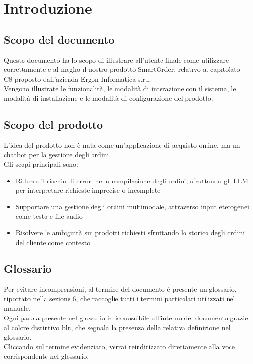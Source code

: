 \section{Introduzione}
\subsection{Scopo del documento}
Questo documento ha lo scopo di illustrare all'utente finale come utilizzare correttamente e al meglio il nostro prodotto SmartOrder, relativo al capitolato C8 proposto dall'azienda Ergon Informatica s.r.l.\\
Vengono illustrate le funzionalit\`a, le modalit\`a di interazione con il sistema, le modalit\`a di installazione e le modalit\`a di configurazione del prodotto.

\subsection{Scopo del prodotto}
L'idea del prodotto non \`e nata come un'applicazione di acquisto online, ma un \hyperlink{glossario:chatbot}{chatbot} per la gestione degli ordini.\\
Gli scopi principali sono:
\begin{itemize}
	\item Ridurre il rischio di errori nella compilazione degli ordini, sfruttando gli \hyperlink{glossario:llm}{LLM} per interpretare richieste imprecise o incomplete
	\item Supportare una gestione degli ordini multimodale, attraverso input eterogenei come testo e file audio
	\item Risolvere le ambiguit\`a sui prodotti richiesti sfruttando lo storico degli ordini del cliente come contesto
\end{itemize}

\subsection{Glossario}
Per evitare incomprensioni, al termine del documento \`e presente un glossario, riportato nella sezione 6, che raccoglie tutti i termini particolari utilizzati nel manuale.\\
Ogni parola presente nel glossario \`e riconoscibile all'interno del documento grazie al colore distintivo blu, che segnala la presenza della relativa definizione nel glossario.\\
Cliccando sul termine evidenziato, verrai reindirizzato direttamente alla voce corrispondente nel glossario.

